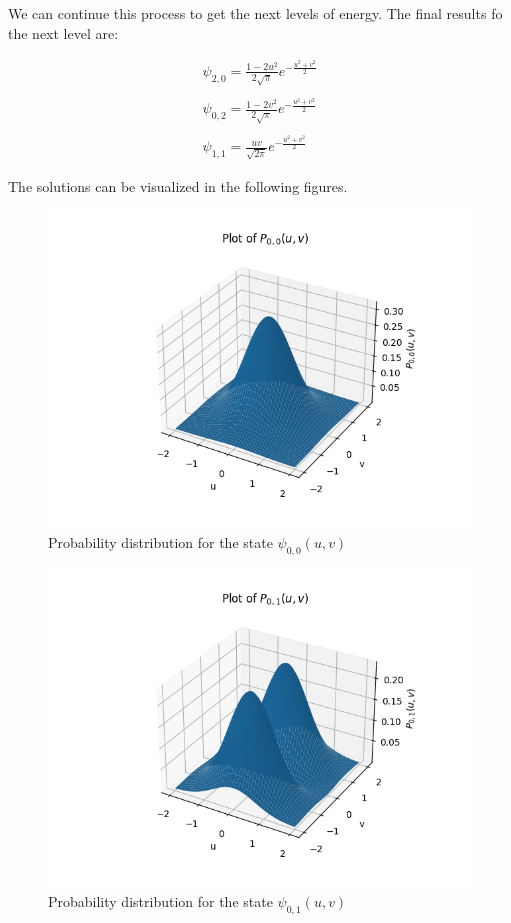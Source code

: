 We can continue this process to get the next levels of energy. The final results fo the next level are:

\begin{equation}
  \begin{array}{c}
    \psi_{2,0} = \frac{1-2u^2}{2\sqrt{\pi}}e^{-\frac{u^2+v^2}{2}}
    \\

    \\
    \psi_{0,2} = \frac{1-2v^2}{2\sqrt{\pi}}e^{-\frac{u^2+v^2}{2}}
    \\

    \\
    \psi_{1,1} = \frac{uv}{\sqrt{2\pi}}e^{-\frac{u^2+v^2}{2}}
  \end{array}
\end{equation}

The solutions can be visualized in the following figures.

\begin{figure}
  \centering
  \includegraphics{images8/P_0,0.png}
  \caption{Probability distribution for the state $\psi_{0,0}(u,v)$}
\end{figure}

\begin{figure}
  \centering
  \includegraphics{images8/P_0,1.png}
  \caption{Probability distribution for the state $\psi_{0,1}(u,v)$}
\end{figure}

